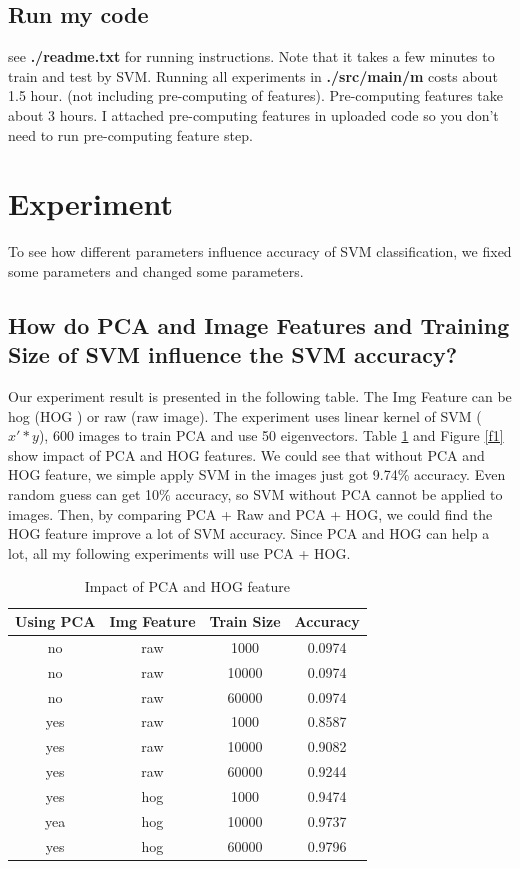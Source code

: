\documentclass[10pt,twocolumn,letterpaper]{article}
\begin{document}
\subsection{Run my code}
see \textbf{./readme.txt} for running instructions. Note that it takes a few minutes to train and test by SVM. Running all experiments in \textbf{./src/main/m} costs about 1.5 hour. (not including pre-computing of features). Pre-computing features take about 3 hours. I attached pre-computing features in uploaded code so you don't need to run pre-computing feature step.

\section{Experiment}
To see how different parameters influence accuracy of SVM classification, we fixed some parameters and changed some parameters.

\subsection{How do PCA and Image Features and Training Size of SVM influence the SVM accuracy?}
Our experiment result is presented in the following table. The Img Feature can be hog (HOG \cite{dalal2005histograms}) or raw (raw image). The experiment uses linear kernel of SVM ($x' * y$), 600 images to train PCA and use 50 eigenvectors. Table \ref{t1} and Figure \ref{f1} show impact of PCA and HOG features. We could see that without PCA and HOG feature, we simple apply SVM in the images just got 9.74\% accuracy. Even random guess can get 10\% accuracy, so SVM without PCA cannot be applied to images. Then, by comparing PCA + Raw and PCA + HOG, we could find the HOG feature improve a lot of SVM accuracy. Since PCA and HOG can help a lot, all my following experiments will use PCA + HOG.
\begin{table}

    \begin{tabular}{|c|c|c|c|}
      \hline
      Using PCA & Img Feature & Train Size & Accuracy \\
      \hline
      no & raw & 1000 & 0.0974 \\
      no & raw & 10000 & 0.0974 \\
      no & raw & 60000 & 0.0974 \\
      \hline
      yes & raw & 1000 & 0.8587 \\
      yes & raw & 10000 & 0.9082 \\
      yes & raw & 60000 & 0.9244 \\
      \hline
      yes & hog & 1000 & 0.9474 \\
      yea & hog & 10000 & 0.9737 \\
      yes & hog & 60000 & 0.9796 \\
      \hline
    \end{tabular}
    \caption{Impact of PCA and HOG feature}
    \label{t1}
\end{table}
\end{document}
